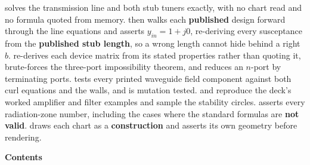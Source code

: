 \documentclass[10pt]{article}
\begin{document}
\par{}\vspace{12pt}
\begin{center}
\begin{minipage}{0.88\textwidth}\small\color{sub}
  solves the
transmission line and both stub tuners exactly, with no chart read and no formula quoted
from memory.  then walks each \textbf{published} design forward through
the line equations and asserts $y_{in} = 1 + j0$, re-deriving every susceptance from the
\textbf{published stub length}, so a wrong length cannot hide behind a right $b$.
 re-derives each device matrix from its stated properties rather than
quoting it, brute-forces the three-port impossibility theorem, and reduces an $n$-port by
terminating ports.  tests every printed waveguide field component against
both curl equations and the walls, and is mutation tested.  and
 reproduce the deck's worked amplifier and filter examples and sample the
stability circles.  asserts every radiation-zone number, including the
cases where the standard formulas are \textbf{not valid}.  draws each
chart as a \textbf{construction} and asserts its own geometry before rendering.
\end{minipage}
\end{center}

\cleardoublepage
\pagestyle{fancy}


\cleardoublepage
{\Large\bfseries\color{acc} Contents}
\vspace{-6pt}{\color{acc}\rule{\textwidth}{1.1pt}}\vspace{4pt}
\begingroup
\renewcommand{\contentsname}{}
\setcounter{tocdepth}{1}
\vspace{-24pt}
\tableofcontents
\endgroup

\cleardoublepage
\setcounter{section}{1}


\cleardoublepage
\setcounter{section}{2}


\cleardoublepage
\setcounter{section}{3}


\cleardoublepage
\setcounter{section}{5}


\cleardoublepage
\setcounter{section}{6}


\cleardoublepage
{}
{}

\end{document}
